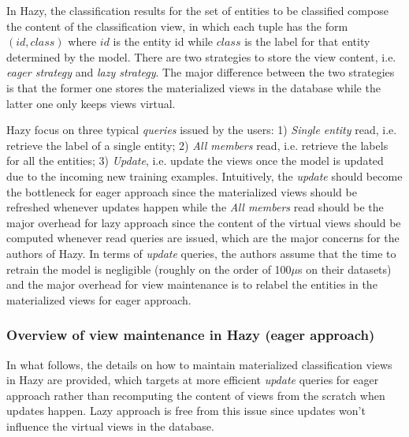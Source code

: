 In Hazy, the classification results for the set of entities to be classified compose the content of the classification view, in which each tuple has the form $(id, class)$ where $id$ is the entity id while $class$ is the label for that entity determined by the model. There are two strategies to store the view content, i.e. {\em eager strategy} and {\em lazy strategy}. The major difference between the two strategies is that the former one stores the materialized views in the database while the latter one only keeps views virtual.

Hazy focus on three typical {\em queries} issued by the users: 1) {\em Single entity} read, i.e. retrieve the label of a single entity; 2) {\em All members} read, i.e. retrieve the labels for all the entities; 3) {\em Update}, i.e. update the views once the model is updated due to the incoming new training examples. Intuitively, the {\em update} should become the bottleneck for eager approach since the materialized views should be refreshed whenever updates happen while the {\em All members} read should be the major overhead for lazy approach since the content of the virtual views should be computed whenever read queries are issued, which are the major concerns for the authors of Hazy. In terms of {\em update} queries, the authors assume that the time to retrain the model is negligible (roughly on the order of 100$\mu$s on their datasets) and the major overhead for view maintenance is to relabel the entities in the materialized views for eager approach. 

\subsubsection{Overview of view maintenance in Hazy (eager approach)}
In what follows, the details on how to maintain materialized classification views in Hazy are provided, which targets at more efficient {\em update} queries for eager approach rather than recomputing the content of views from the scratch when updates happen. Lazy approach is free from this issue since updates won't influence the virtual views in the database. 

